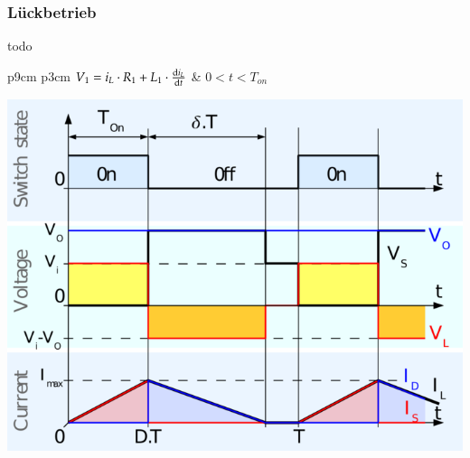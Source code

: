 \subsubsection{Lückbetrieb}
\begin{minipage}{0.75\linewidth}
        todo
    
    \begin{tabular}{p{9cm} p{3cm}}
        $ V_1 = i_L\cdot R_1+L_1\cdot\frac{\mathop{}\!\mathrm{d} i_L}{\mathop{}\!\mathrm{d} t} $ &
        $ 0<t<T_{on} $
        \\  
        
    \end{tabular}
\end{minipage}
\begin{minipage}{0.25\linewidth}
    \includegraphics[width=\linewidth]{images/BoostSwitchLueck}
\end{minipage}

